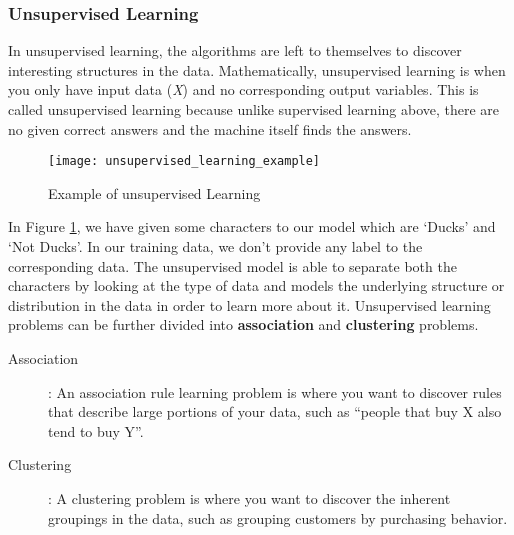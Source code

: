\subsubsection{Unsupervised Learning}

In unsupervised learning, the algorithms are left to themselves to discover interesting structures in the data. Mathematically, unsupervised
learning is when you only have input data (\textit{X}) and no corresponding output variables. This is called unsupervised learning because
unlike supervised learning above, there are no given correct answers and the machine itself finds the answers.
\begin{figure}[h]
  \centering
  \texttt{[image: unsupervised\_learning\_example]}
  \caption{Example of unsupervised Learning}
  \label{fig:unsupervised_learning_example}
\end{figure}
In Figure \ref{fig:unsupervised_learning_example}, we have given some characters to our model which are ‘Ducks’ and ‘Not Ducks’. In our
training data, we don’t provide any label to the corresponding data. The unsupervised model is able to separate both the characters by
looking at the type of data and models the underlying structure or distribution in the data in order to learn more about it. Unsupervised
learning problems can be further divided into \textbf{association} and \textbf{clustering} problems.

\begin{description}
\item[ Association] : An association rule learning problem is where you want to discover rules that describe large portions of your data, such as “people that buy X also tend to buy Y”.
\item[ Clustering] : A clustering problem is where you want to discover the inherent groupings in the data, such as grouping customers by purchasing behavior.
\end{description}

